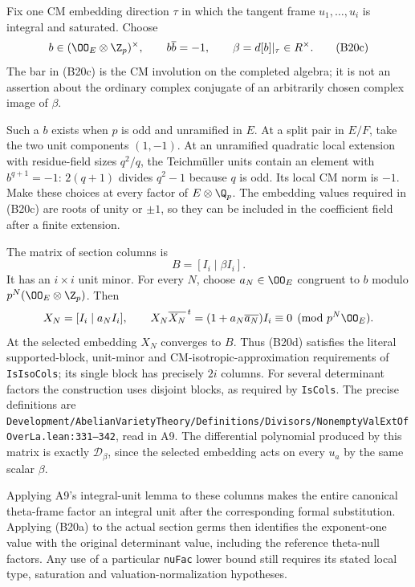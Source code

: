 Fix one CM embedding direction $\tau$ in which the tangent
frame $u_1,\ldots,u_i$ is integral and saturated.  Choose
\[
 b\in(\OO_E\otimes\Z_p)^\times,
                   \qquad b\overline b=-1,
                   \qquad \beta=d[b]|_\tau\in R^\times.
 \tag{B20c}
\]
The bar in (B20c) is the CM involution on the completed algebra;
it is not an assertion about the ordinary complex conjugate
of an arbitrarily chosen complex image of $\beta$.

Such a $b$ exists when $p$ is odd and unramified in $E$.
At a split pair in $E/F$, take the two unit components
$(1,-1)$.  At an unramified quadratic local extension with
residue-field sizes $q^2/q$, the Teichm\"uller units contain an
element with $b^{q+1}=-1$: $2(q+1)$ divides $q^2-1$ because
$q$ is odd.  Its local CM norm is $-1$.
Make these choices at every factor of $E\otimes\Q_p$.
The embedding values required in (B20c) are roots of unity or
$\pm1$, so they can be included in the coefficient field after
a finite extension.

The matrix of section columns is
\[
                         B=[I_i\mid\beta I_i].
 \tag{B20d}
\]
It has an $i\times i$ unit minor.  For every $N$, choose
$a_N\in\OO_E$ congruent to $b$ modulo
$p^N(\OO_E\otimes\Z_p)$.  Then
\[
 X_N=[I_i\mid a_NI_i],\qquad
 X_N\overline{X_N}^{\,t}
                  =(1+a_N\overline{a_N})I_i
                        \equiv0\pmod{p^N\OO_E}.
\]
At the selected embedding $X_N$ converges to $B$.
Thus (B20d) satisfies the literal supported-block, unit-minor
and CM-isotropic-approximation requirements of
\texttt{IsIsoCols}; its single block has precisely $2i$ columns.
For several determinant factors the construction uses disjoint
blocks, as required by \texttt{IsCols}.  The precise definitions
are
\texttt{Development/AbelianVarietyTheory/Definitions/Divisors/NonemptyValExtOfOverLa.lean:331--342},
read in A9.  The differential polynomial produced by this
matrix is exactly $\mathcal D_\beta$, since the selected
embedding acts on every $u_a$ by the same scalar $\beta$.

Applying A9's integral-unit lemma to these columns makes the
entire canonical theta-frame factor an integral unit after
the corresponding formal substitution.  Applying (B20a) to
the actual section germs then identifies the exponent-one
value with the original determinant value, including the
reference theta-null factors.  Any use of a particular
\texttt{nuFac} lower bound still requires its stated local
type, saturation and valuation-normalization hypotheses.


